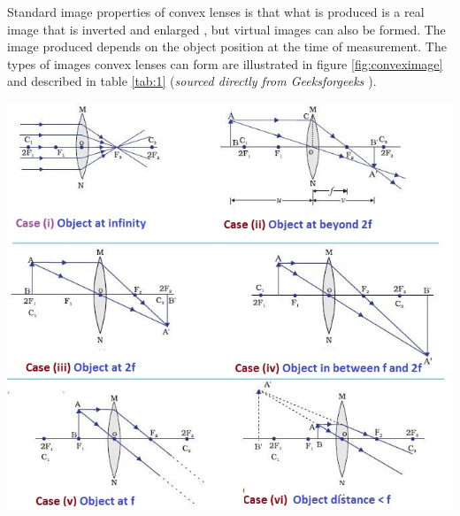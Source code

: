\documentclass[12pt]{article}
\begin{document}
Standard image properties of convex lenses is that what is produced is a real image that is inverted and enlarged
\cite{geekconvex}, but virtual images can also be formed.
The image produced depends on the object position at the time of measurement.
The types of images convex lenses can form are illustrated in figure \ref{fig:conveximage} and described in table \ref{tab:1} (\textit{sourced directly from Geeksforgeeks \cite{geekconvex}}).

\begin{minipage}{.5\textwidth}
    \captionsetup{hypcap=false}
    \centering
    \includegraphics[width=.9\linewidth]{convex.jpg}
    \label{fig:conveximage}
\end{minipage}
\hfill
\end{document}
